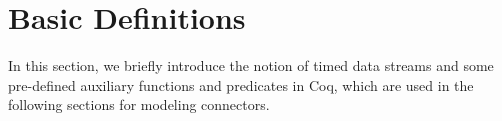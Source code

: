 \documentclass{llncs}
\begin{document}




\section{Basic Definitions}\label{sec:basicdef}

In this section, we briefly introduce the notion of timed data streams and some pre-defined auxiliary functions and predicates in Coq, which are used in the following sections for modeling connectors.
\end{document}
